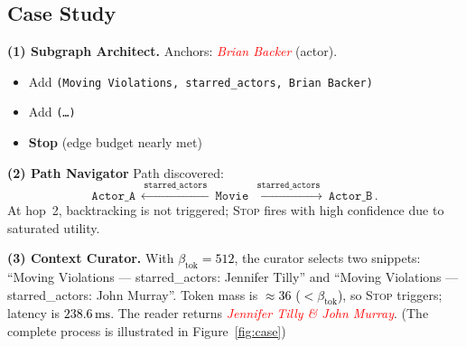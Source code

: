 \documentclass{article} %
\begin{document}
\subsection{Case Study}
\label{app:case}

\begin{tcolorbox}[title={Question: \emph{Who co-starred with Brian Backer?}}]

\textbf{(1) Subgraph Architect.}
Anchors: \textcolor{red}{\textit{Brian Backer}} (actor).
\begin{itemize}
  \item Add \texttt{(Moving Violations, starred\_actors, Brian Backer)}
  \item Add \texttt{(\dots)}
  \item \textbf{Stop} (edge budget nearly met)
\end{itemize}

\medskip
\textbf{(2) Path Navigator}
Path discovered:
\[
\texttt{Actor\_A}\ \xleftarrow{\ \texttt{starred\_actors}\ }\ \texttt{Movie}\ 
\xrightarrow{\ \texttt{starred\_actors}\ }\ \texttt{Actor\_B}\,.
\]
At hop~2, backtracking is not triggered; \textsc{Stop} fires with high confidence due to saturated utility.

\medskip
\textbf{(3) Context Curator.}
With \textcolor{black}{$\beta_{\text{tok}}=512$}, the curator selects two snippets: ``Moving Violations --- starred\_actors: Jennifer Tilly'' and ``Moving Violations --- starred\_actors: John Murray''. Token mass is \textcolor{black}{$\approx 36$ ($<\beta_{\text{tok}}$)}, so \textsc{Stop} triggers; latency is \textcolor{black}{$238.6\,\mathrm{ms}$}. The reader returns \textcolor{red}{\textit{Jennifer Tilly \& John Murray}}. (The complete process is illustrated in Figure~\ref{fig:case})
\end{tcolorbox}
\end{document}
